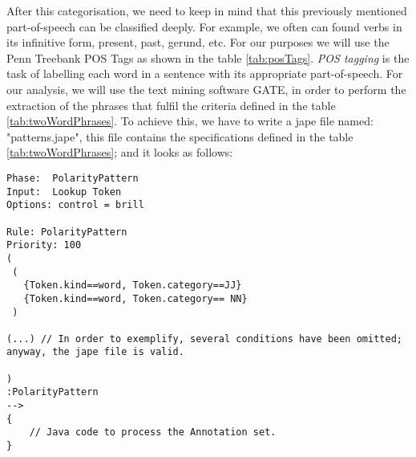 After this categorisation, we need to keep in mind that this previously mentioned part-of-speech can be classified deeply. For example, we often can found verbs in its infinitive form, present, past, gerund, etc. For our purposes we will use the Penn Treebank POS Tags as shown in the table \ref{tab:posTags}. \emph{POS tagging} is the task of labelling each word in a sentence with its appropriate part-of-speech. For our analysis, we will use the text mining software GATE, in order to perform the extraction of the phrases that fulfil the criteria defined in the table \ref{tab:twoWordPhrases}. To achieve this, we have to write a jape file named: "patterns.jape", this file contains the specifications defined in the table \ref{tab:twoWordPhrases}; and it looks as follows: 

\begin{lstlisting}
Phase:	PolarityPattern
Input:  Lookup Token
Options: control = brill

Rule: PolarityPattern
Priority: 100
(
 (
   {Token.kind==word, Token.category==JJ}
   {Token.kind==word, Token.category== NN}
 )
 
(...) // In order to exemplify, several conditions have been omitted; anyway, the jape file is valid.

)
:PolarityPattern
-->
{
	// Java code to process the Annotation set.
}
\end{lstlisting}

